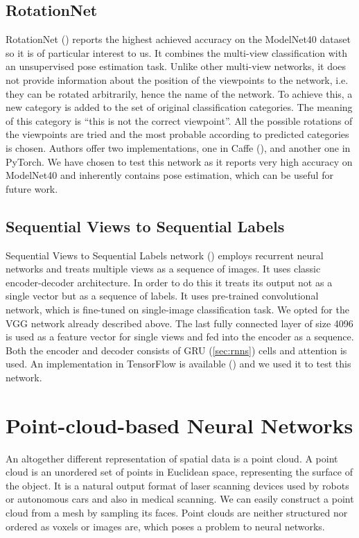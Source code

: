 \subsection{RotationNet}
RotationNet (\cite{kanezaki_rotationnet:_2018}) reports the highest achieved accuracy on the ModelNet40 dataset so it is of particular interest to us. It combines the multi-view classification with an unsupervised pose estimation task. Unlike other multi-view networks, it does not provide information about the position of the viewpoints to the network, i.e. they can be rotated arbitrarily, hence the name of the network. 
To achieve this, a new category is added to the set of original classification categories. The meaning of this category is “this is not the correct viewpoint”. All the possible rotations of the viewpoints are tried and the most probable according to predicted categories is chosen. Authors offer two implementations, one in Caffe (\cite{kanezaki_rotationnet_2018}), and another one in PyTorch. We have chosen to test this network as it reports very high accuracy on ModelNet40 and inherently contains pose estimation, which can be useful for future work.

\subsection{Sequential Views to Sequential Labels}
Sequential Views to Sequential Labels network (\cite{zhizhong_seqviews2seqlabels:_2018}) employs recurrent neural networks and treats multiple views as a sequence of images. It uses classic encoder-decoder architecture. In order to do this it treats its output not as a single vector but as a sequence of labels. It uses pre-trained convolutional network, which is fine-tuned on single-image classification task. We opted for the VGG network already described above. The last fully connected layer of size 4096 is used as a feature vector for single views and fed into the encoder as a sequence. Both the encoder and decoder consists of GRU (\autoref{sec:rnns}) cells and attention is used. An implementation in TensorFlow is available (\cite{zhizhong_seq2seq_2018}) and we used it to test this network.

\section{Point-cloud-based Neural Networks}
An altogether different representation of spatial data is a point cloud. A point cloud is an unordered set of points in Euclidean space, representing the surface of the object. It is a natural output format of laser scanning devices used by robots or autonomous cars and also in medical scanning. We can easily construct a point cloud from a mesh by sampling its faces. Point clouds are neither structured nor ordered as voxels or images are, which poses a problem to neural networks.


